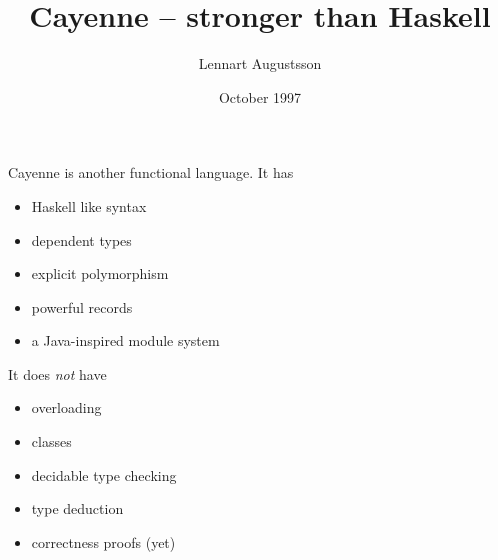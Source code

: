 \documentclass[17pt]{foils} %
\title{
Cayenne -- stronger than Haskell
}
\author{ Lennart Augustsson
}
\date{ October 1997 }
\begin{document}
\maketitle

Cayenne is another functional language.  It has
\begin{itemize}
\item Haskell like syntax
\item dependent types
\item explicit polymorphism
\item powerful records
\item a Java-inspired module system
\end{itemize}

It does {\em not} have
\begin{itemize}
\item overloading
\item classes
\item decidable type checking
\item type deduction
\item correctness proofs (yet)
\end{itemize}

\newpage


\end{document}
